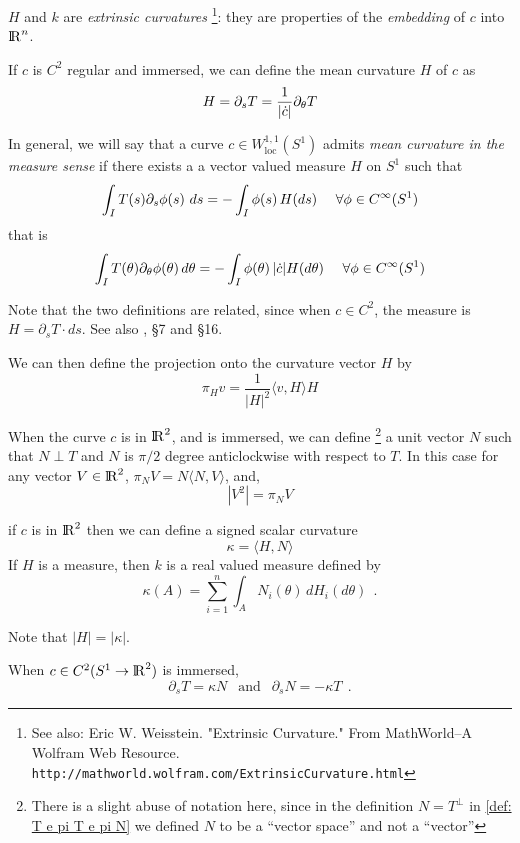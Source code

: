 \documentclass[twoside,a4paper,english]{article}
\def\derpar#1{\partial_{#1}}
\begin{document}
$H$ and $k$ are \emph{extrinsic curvatures}
\footnote{See also:
Eric W. Weisstein. "Extrinsic Curvature." From MathWorld--A
  Wolfram Web  Resource.
  \texttt{http://mathworld.wolfram.com/ExtrinsicCurvature.html} }:
they are properties of the \emph{embedding} of $c$ into ${\protect\mathrm{l\hskip-0.15em R}}^n$.


\begin{Definition}[H]\label{def di H}
  If $c$ is $C^2$ regular and immersed,
  we can define the mean curvature $H$  of
  $c$ as 
  \[H=  \derpar s T =\frac 1{|\overdot c|} \derpar \theta T\]

  In general, we will say that a curve  $c\in W^{1,1}_\text{loc}(S^1)$ admits
  \emph{mean curvature in the measure sense} if there exists a 
  a vector valued  measure $H$ on $S^1$ 
  such that
    $$\int_I T(s) \derpar s\phi(s)~ds  = 
    - \int_I  \phi(s) \, H(ds)
    ~~~~\forall \phi\in C^\infinity (S^1)$$
    that is 
    $$\int_I T(\theta) \derpar \theta\phi(\theta)\,d\theta
    =     - \int_I  \phi(\theta) \,|\overdot c| H(d\theta)
    ~~~~\forall \phi\in C^\infinity (S^1)$$



  Note that the two definitions are related, since when $c\in C^2$,
  the measure is $H=\derpar s T\cdot ds$.
  See also \cite{simon}, \S7 and \S16.
\end{Definition}

We can then define the projection onto the curvature vector $H$ by 
\[ \pi_H v = \frac 1 {|H|^2} \langle v , H\rangle H \]


\begin{Definition}[N]\label{def di N}
  When the curve $c$ is in ${\protect\mathrm{l\hskip-0.15em R}}^2$, and is immersed, 
  we can define%
  \footnote{There is a slight abuse of notation here, 
    since in the definition $N=T^\perp$ in \ref{def: T e pi T e pi N}
    we defined $N$ to be a ``vector space'' and not a ``vector''}
  a unit vector $N$ 
  such that $N\perp T$ and  $N$ is $\pi/2$ degree anticlockwise
  with respect to $T$. In this case   for any vector $V\in {\protect\mathrm{l\hskip-0.15em R}}^2$,
  $\pi_N V = N \langle N,V \rangle$, and,
  \[ |V^2| = \pi_N V   \]
\end{Definition}


\begin{Definition}[$\kappa$]\label{def di k}
  if $c$ is in ${\protect\mathrm{l\hskip-0.15em R}}^2$   then we can define a signed 
  scalar curvature
    \[ \kappa =\langle H , N\rangle  \]
    If $H$ is a measure, then $k$ is a real valued measure
    defined by
    \[ \kappa (A)=\sum_{i=1}^n\int_A N_i(\theta)\,  dH_i(d\theta)  ~~. \]

    Note that $|H|=|\kappa|$.

    When $c\in C^2(S^1\to{\protect\mathrm{l\hskip-0.15em R}}^2)$ is immersed,
    \[\derpar s T = \kappa N ~~\text{ and  } ~~\derpar s N = -\kappa T ~~.\]
\end{Definition}
\end{document}
